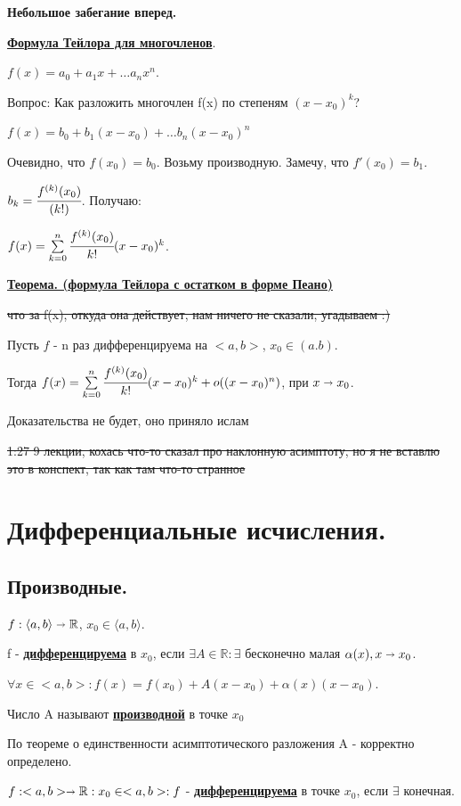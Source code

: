 \documentclass{article}
\newcommand{\deff}[1]{\underline{\textbf{#1}}}
\newcommand{\thmm}[1]{\underline{\textbf{#1}}}
\begin{document}
\textbf{Небольшое забегание вперед.}

\deff{Формула Тейлора для многочленов}.

$f(x) = a_0 + a_1x + \ldots a_n x^n$.

Вопрос: Как разложить многочлен f(x) по степеням $(x-x_0)^k$?

$f(x) = b_0 + b_1 (x-x_0) +\ldots b_n (x-x_0)^n$

Очевидно, что $f(x_0) = b_0$. Возьму производную. Замечу, что $f'(x_0) = b_1$. 

$b_k = \cfrac{f^{(k)}(x_0)}{(k!)}$. Получаю:

$f(x) = \sum\limits_{k=0}^n \cfrac{f^{(k)}(x_0)}{k!} (x-x_0)^k$.

\thmm{Теорема. (формула Тейлора с остатком в форме Пеано)}

\sout{что за f(x), откуда она действует, нам ничего не сказали, угадываем :) }

Пусть $f$ - n раз дифференцируема на $<a,b>$, $x_0 \in (a.b)$.

Тогда $f(x) = \sum\limits_{k=0}^n \cfrac{f^{(k)}(x_0)}{k!} (x-x_0)^k + o((x-x_0)^n)$, при $x\shortrightarrow x_0$.

Доказательства не будет, оно приняло ислам

\sout{1:27 9 лекции, кохась что-то сказал про наклонную  асимптоту, но я не вставлю это в конспект, так как там что-то странное}



\pagebreak
\section{Дифференциальные исчисления.}
\subsection{Производные.}
$f: \langle a,b\rangle \shortrightarrow \mathbb{R}$, $x_0 \in \langle a,b \rangle$.

f - \deff{дифференцируема} в $x_0$, если $\exists A\in \mathbb{R}: \exists$ бесконечно малая $\alpha(x), x\shortrightarrow x_0$.

$\forall x \in <a,b>: f(x) = f(x_0) + A(x-x_0) + \alpha(x) (x-x_0)$.

Число A называют \deff{производной} в точке $x_0$

По теореме о единственности асимптотического разложения A - корректно определено.

$f:<a,b> \shortrightarrow \mathbb{R}: x_0 \in <a,b>: f$ - \deff{дифференцируема} в точке $x_0$, если $\exists$ конечная.
\end{document}
